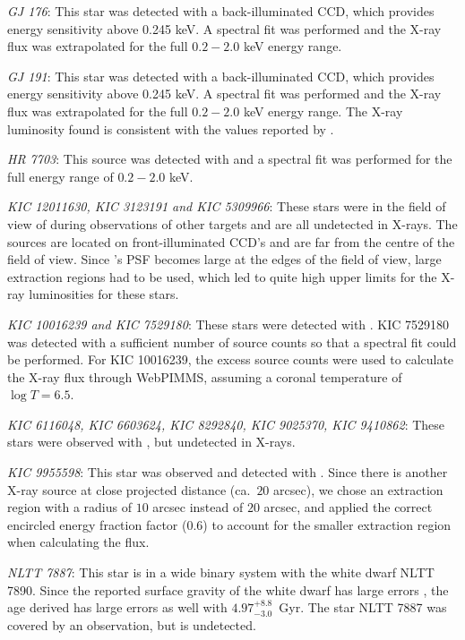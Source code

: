 \textit{GJ 176}: This star was detected with a back-illuminated \Chandra CCD, which provides energy sensitivity above 0.245 keV. A spectral fit was performed and the X-ray flux was extrapolated for the full $0.2 - 2.0$ keV energy range.

\textit{GJ 191}: This star was detected with a back-illuminated \Chandra CCD, which provides energy sensitivity above 0.245 keV. A spectral fit was performed and the X-ray flux was extrapolated for the full $0.2 - 2.0$ keV energy range. The X-ray luminosity found is consistent with the values reported by \citet{Guinan_etal_2016}.

\textit{HR 7703}: This source was detected with \XMM and a spectral fit was performed for the full energy range of $0.2 - 2.0$ keV.

\textit{KIC 12011630, KIC 3123191 and KIC 5309966}: These stars were in the field of view of \Chandra during observations of other targets and are all undetected in X-rays. The sources are located on front-illuminated CCD's and are far from the centre of the field of view. Since \Chandra's PSF becomes large at the edges of the field of view, large extraction regions had to be used, which led to quite high upper limits for the X-ray luminosities for these stars.

\textit{KIC 10016239 and KIC 7529180}: These stars were detected with \XMM. KIC 7529180 was detected with a sufficient number of source counts so that a spectral fit could be performed. For KIC 10016239, the excess source counts were used to calculate the X-ray flux through WebPIMMS, assuming a coronal temperature of $\log T = 6.5$.

\textit{KIC 6116048, KIC 6603624, KIC 8292840, KIC 9025370, KIC 9410862}: These stars were observed with \XMM, but undetected in X-rays.

\textit{KIC 9955598}: This star was observed and detected with \XMM. Since there is another X-ray source at close projected distance (ca.\ $20$ arcsec), we chose an extraction region with a radius of $10$ arcsec instead of $20$ arcsec, and applied the correct encircled energy fraction factor (0.6) to account for the smaller extraction region when calculating the flux.

\textit{NLTT 7887}: This star is in a wide binary system with the white dwarf NLTT 7890. Since the reported surface gravity of the white dwarf has large errors \citep{Garces_etal_2011}, the age derived has large errors as well with $4.97^{+8.8}_{-3.0}$~Gyr. The star NLTT 7887 was covered by an \XMM observation, but is undetected.

